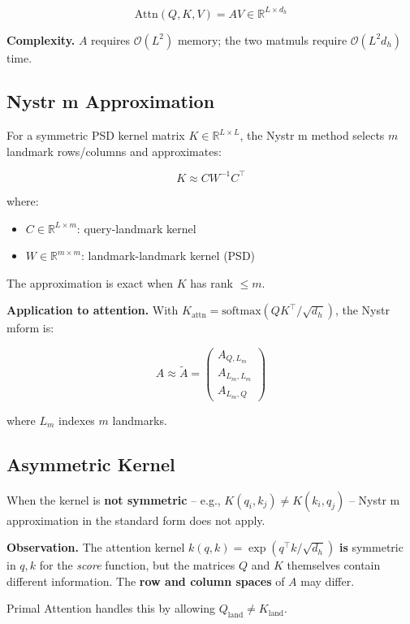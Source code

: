 \[
\text{Attn}(Q, K, V) = A V \in \mathbb{R}^{L \times d_h}
\]

\textbf{Complexity.} $A$ requires $\mathcal{O}(L^2)$ memory; the two matmuls 
require $\mathcal{O}(L^2 d_h)$ time.

\subsection{Nystr m Approximation}

For a symmetric PSD kernel matrix $K \in \mathbb{R}^{L \times L}$, the Nystr m 
method selects $m$ landmark rows/columns and approximates:

\[
K \approx C W^{-1} C^\top
\]

where:

\begin{itemize}
\item $C \in \mathbb{R}^{L \times m}$: query-landmark kernel
\item $W \in \mathbb{R}^{m \times m}$: landmark-landmark kernel (PSD)

\end{itemize}
The approximation is exact when $K$ has rank $\le m$.

\textbf{Application to attention.} With $K_\text{attn} = \text{softmax}(QK^\top / \sqrt{d_h})$, 
the Nystr mform is:

\[
A \approx \tilde{A} = \begin{pmatrix} A_{Q, L_m} \\ A_{L_m, L_m} \\ A_{L_m, Q} \end{pmatrix}
\]

where $L_m$ indexes $m$ landmarks.

\subsection{Asymmetric Kernel}

When the kernel is \textbf{not symmetric} -- e.g., $K(q_i, k_j) \ne K(k_i, q_j)$ 
-- Nystr m approximation in the standard form does not apply.

\textbf{Observation.} The attention kernel $k(q, k) = \exp(q^\top k / \sqrt{d_h})$ 
\textbf{is} symmetric in $q, k$ for the \textit{score} function, but the matrices $Q$ and 
$K$ themselves contain different information. The \textbf{row and column spaces} 
of $A$ may differ.

Primal Attention handles this by allowing $Q_\text{land} \ne K_\text{land}$.

